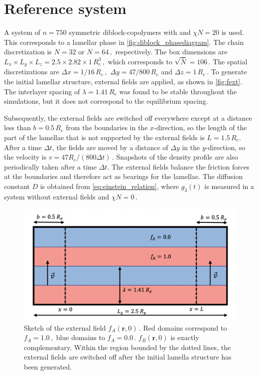 \documentclass[bachelor,       %
               oneside,        %
               BCOR10mm,       %
               ngerman, english %
               ]{GAUBM}
\begin{document}
\section{Reference system}
A system of $n=750$ symmetric diblock-copolymers with and $\chi N=20$ is used. This corresponds to a lamellar phase in \autoref{fig:diblock_phasediagram}. The chain discretization is $N=32$ or $N=64\,,$ respectively. The box dimensions are $L_x\times L_y\times L_z=2.5\times2.82\times1\,R_e^3\,,$ which corresponds to $\sqrt{\bar{N}}=106\,.$ The spatial discretizations are $\Delta x=1/16\,R_e\,,$ $\Delta y=47/800\,R_e$ and $\Delta z=1\,R_e\,.$ To generate the initial lamellar structure, external fields are applied, as shown in \autoref{fig:fext}. The interlayer spacing of $\lambda=1.41\,R_e$ was found to be stable throughout the simulations, but it does not correspond to the equilibrium spacing.

Subsequently, the external fields are switched off everywhere except at a distance less than $b=0.5\,R_e$ from the boundaries in the $x$-direction, so the length of the part of the lamellae that is not supported by the external fields is $L=1.5\,R_e$. After a time $\Delta t$, the fields are moved by a distance of $\Delta y$ in the $y$-direction, so the velocity is $v=47R_e/(800\Delta t)\,.$ Snapshots of the density profile are also periodically taken after a time $\Delta t$. The external fields balance the friction forces at the boundaries and therefore act as bearings for the lamellae. The diffusion constant $D$ is obtained from \autoref{eq:einstein_relation}, where $g_3(t)$ is measured in a system without external fields and $\chi N=0\,.$

\begin{figure}[h]
    \centering
    \includegraphics[width=0.6\linewidth]{figures/fext.png}
    \caption{Sketch of the external field $f_A(\mathbf r,0)\,.$ Red domains correspond to $f_A=1.0\,,$ blue domains to $f_A=0.0\,.$ $f_B(\mathbf r,0)$ is exactly complementary. Within the region bounded by the dotted lines, the external fields are switched off after the initial lamella structure has been generated.}
    \label{fig:fext}
\end{figure}
\end{document}
